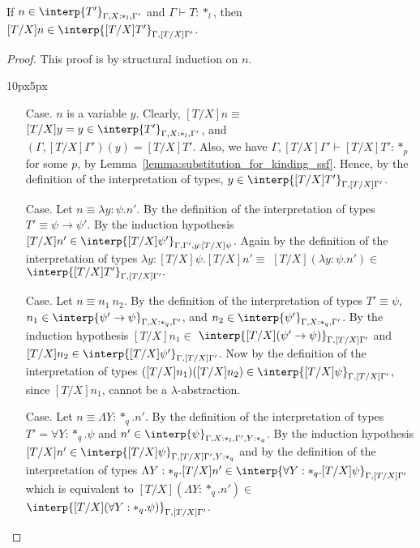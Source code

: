 \begin{lemma}
  \,\\ If $n \in \interp{T'}_{\Gamma,X:*_l,\Gamma'}$ and 
  $\Gamma \vdash T:*_l$, then 
  $[T/X]n \in \interp{[T/X]T'}_{\Gamma,[T/X]\Gamma'}$.
  \label{lemma:type_sub_ssf}
\end{lemma}
\begin{proof}
  This proof is by structural induction on $n$.
\vspace{-25px}
\begin{changemargin}{10px}{5px}\noindent
\begin{itemize}
\item[Case.] $n$ is a variable $y$.  Clearly, $[T/X]n \equiv $
  $[T/X]y = y \in \interp{T'}_{\Gamma,X:*_l,\Gamma'}$, and\\
  $(\Gamma,[T/X]\Gamma')(y) = [T/X]T'$. Also,
  we have $\Gamma,[T/X]\Gamma' \vdash [T/X]T':*_p$ for some $p$, by 
  Lemma~\ref{lemma:substitution_for_kinding_ssf}. Hence,
  by the definition of the interpretation of types, 
  $y \in \interp{[T/X]T'}_{\Gamma,[T/X]\Gamma'}$.
  
\item[Case.] Let $n \equiv \lambda y:\psi.n'$.  By the definition of the
  interpretation of types $T' \equiv \psi \rightarrow \psi'$.  
  By the induction hypothesis 
  $[T/X]n' \in \interp{[T/X]\psi'}_{\Gamma,\Gamma',y:[T/X]\psi}$. 
  Again by the definition of the interpretation of types
  $\lambda y:[T/X]\psi.[T/X]n' \equiv $
  $[T/X](\lambda y:\psi.n') \in $
  $\interp{[T/X]T'}_{\Gamma,[T/X]\Gamma'}.$
  
\item[Case.]  Let $n \equiv n_1\ n_2$.  By the definition of the 
  interpretation of types $T' \equiv \psi$, 
  $n_1 \in \interp{\psi' \rightarrow \psi}_{\Gamma,X:*_q,\Gamma'}$, and
  $n_2 \in \interp{\psi'}_{\Gamma,X:*_q,\Gamma'}$.  By the induction hypothesis 
  $[T/X]n_1 \in $
  $\interp{[T/X](\psi' \rightarrow \psi)}_{\Gamma,[T/X]\Gamma'}$ and
  $[T/X]n_2 \in \interp{[T/X]\psi'}_{\Gamma,[T/X]\Gamma'}$.  Now by
  the definition of the interpretation of types 
  $([T/X]n_1)([T/X]n_2) \in \interp{[T/X]\psi}_{\Gamma,[T/X]\Gamma'}$,
  since $[T/X]n_1$, cannot be a $\lambda$-abstraction.
  
\item[Case.]  Let $n \equiv \Lambda Y:*_q.n'$.  By the definition of the
  interpretation of types $T' = \forall Y:*_q.\psi$ and 
  $n' \in \interp{\psi}_{\Gamma,X:*_l,\Gamma',Y:*_q}$.  By the induction 
  hypothesis \\
  $[T/X]n' \in \interp{[T/X]\psi}_{\Gamma,[T/X]\Gamma',Y:*_q}$ and by
  the definition of the interpretation of types 
  $\Lambda Y:*_q.[T/X]n' \in 
  \interp{\forall Y:*_q.[T/X]\psi}_{\Gamma,[T/X]\Gamma'}$ which is 
  equivalent to
  $[T/X](\Lambda Y:*_q.n') \in $
  $\interp{[T/X](\forall Y:*_q.\psi)}_{\Gamma,[T/X]\Gamma'}$.
  

\end{itemize}
\end{changemargin}
\end{proof}
